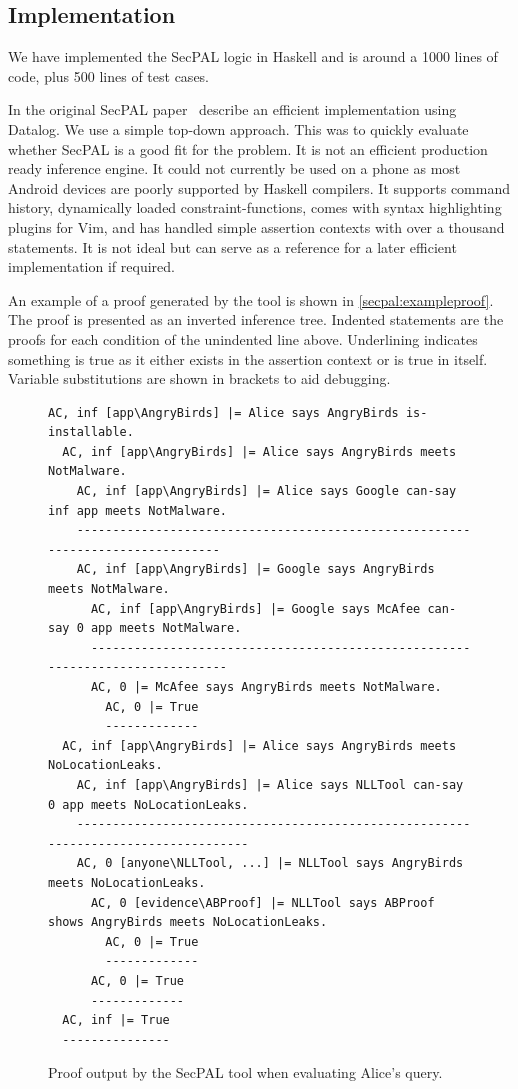 \documentclass[a4paper,sfsidenotes]{%
  article%
}
\begin{document}
\subsection{Implementation}

We have implemented the SecPAL logic in Haskell and is around a
1000 lines of code, plus 500 lines of test cases.

In the original SecPAL paper~\cite{Becker:2006vh}
\citeauthor*{Becker:2006vh} describe an efficient implementation using Datalog.
We use a simple top-down approach.
This was to quickly evaluate whether SecPAL is a good fit for
the problem. It is not an efficient production ready inference
engine.  It could not currently be used on a phone as most Android devices
 are poorly supported by Haskell compilers.
It supports command history, dynamically loaded constraint-functions,
comes with syntax highlighting plugins for Vim, and has handled simple assertion
contexts with over a thousand statements. It is not ideal but can serve as
a reference for a later efficient implementation if required.

An example of a proof generated by the tool is shown in
\autoref{secpal:exampleproof}.  The proof is presented as an inverted
inference tree. Indented statements are the proofs for each condition of
the unindented line above.  Underlining indicates something is  true
as it either exists in the assertion context or is true in itself. Variable
substitutions are shown in brackets to aid debugging.

\begin{figure}
  \begin{lstlisting}[basicstyle=\small\ttfamily,columns=flexible,mathescape]
AC, inf [app\AngryBirds] |= Alice says AngryBirds is-installable.
  AC, inf [app\AngryBirds] |= Alice says AngryBirds meets NotMalware.
    AC, inf [app\AngryBirds] |= Alice says Google can-say inf app meets NotMalware.
    -------------------------------------------------------------------------------
    AC, inf [app\AngryBirds] |= Google says AngryBirds meets NotMalware.
      AC, inf [app\AngryBirds] |= Google says McAfee can-say 0 app meets NotMalware.
      ------------------------------------------------------------------------------
      AC, 0 |= McAfee says AngryBirds meets NotMalware.
        AC, 0 |= True
        -------------
  AC, inf [app\AngryBirds] |= Alice says AngryBirds meets NoLocationLeaks.
    AC, inf [app\AngryBirds] |= Alice says NLLTool can-say 0 app meets NoLocationLeaks.
    -----------------------------------------------------------------------------------
    AC, 0 [anyone\NLLTool, ...] |= NLLTool says AngryBirds meets NoLocationLeaks.
      AC, 0 [evidence\ABProof] |= NLLTool says ABProof shows AngryBirds meets NoLocationLeaks.
        AC, 0 |= True
        -------------
      AC, 0 |= True
      -------------
  AC, inf |= True
  ---------------
  \end{lstlisting}
  \caption{Proof output by the SecPAL tool when evaluating Alice's query.}
\label{secpal:exampleproof}
\end{figure}
\end{document}
